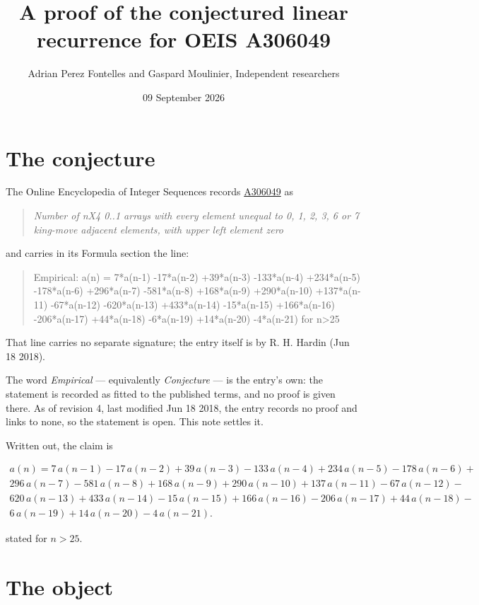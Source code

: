 \documentclass[11pt]{article}
\title{A proof of the conjectured linear recurrence for OEIS A306049}
\author{Adrian Perez Fontelles and Gaspard Moulinier, Independent researchers}
\date{09 September 2026}
\theoremstyle{definition}
\begin{document}
\maketitle
\section{The conjecture}

The Online Encyclopedia of Integer Sequences records \href{https://oeis.org/A306049}{A306049} as

\begin{quote}\itshape Number of nX4 0..1 arrays with every element unequal to 0, 1, 2, 3, 6 or 7 king-move adjacent elements, with upper left element zero\end{quote}

and carries in its Formula section the line:

\begin{quote}\ttfamily Empirical: a(n) = 7*a(n-1) -17*a(n-2) +39*a(n-3) -133*a(n-4) +234*a(n-5) -178*a(n-6) +296*a(n-7) -581*a(n-8) +168*a(n-9) +290*a(n-10) +137*a(n-11) -67*a(n-12) -620*a(n-13) +433*a(n-14) -15*a(n-15) +166*a(n-16) -206*a(n-17) +44*a(n-18) -6*a(n-19) +14*a(n-20) -4*a(n-21) for n>25\end{quote}

That line carries no separate signature; the entry itself is by R. H. Hardin (Jun 18 2018).

The word {\itshape Empirical} --- equivalently {\itshape Conjecture} --- is the entry's own: the statement is recorded as fitted to the published terms, and no proof is given there. As of revision 4, last modified Jun 18 2018, the entry records no proof and links to none, so the statement is open. This note settles it.

Written out, the claim is

\begin{multline*} a(n) = 7\,a(n-1) - 17\,a(n-2) + 39\,a(n-3) - 133\,a(n-4) + 234\,a(n-5) - 178\,a(n-6) + \\ 296\,a(n-7) - 581\,a(n-8) + 168\,a(n-9) + 290\,a(n-10) + 137\,a(n-11) - 67\,a(n-12) - \\ 620\,a(n-13) + 433\,a(n-14) - 15\,a(n-15) + 166\,a(n-16) - 206\,a(n-17) + 44\,a(n-18) - \\ 6\,a(n-19) + 14\,a(n-20) - 4\,a(n-21). \end{multline*}

stated for $n > 25$.

\section{The object}
\end{document}
